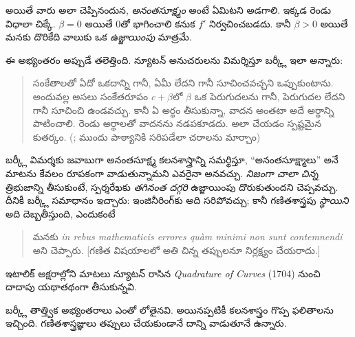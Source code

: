 \documentclass[../../../include/open-logic-section]{subfiles}
\begin{document}
అయితే వారు అలా చెప్పినందున, \emph{అనంతసూక్ష్మం} అంటే ఏమిటని అడగాలి. ఇక్కడ రెండు విధాలా చిక్కే. $\beta = 0$ అయితే $0$తో భాగించాలి కనుక $f'$ నిర్వచించబడదు. కానీ $\beta >
0$ అయితే మనకు దొరికేది వాలుకు ఒక \emph{ఉజ్జాయింపు} మాత్రమే.

ఈ అభ్యంతరం అప్పుడే తలెత్తింది. న్యూటన్ అనుచరులను విమర్శిస్తూ బర్క్లీ ఇలా అన్నారు:
\begin{quote}
సంకేతాలతో ఏదో ఒకదాన్ని గానీ, ఏమీ లేదని గానీ సూచించవచ్చని ఒప్పుకుంటాను. అందువల్ల అసలు సంకేతరూపం $c + \beta$లో $\beta$ ఒక పెరుగుదలను గానీ, పెరుగుదల లేదని గానీ సూచించి ఉండవచ్చు. కానీ ఏ అర్థం తీసుకున్నా, వాదన అంతటా అదే అర్థాన్ని పాటించాలి. రెండు అర్థాలతో వాదనను నడపకూడదు. అలా చేయడం స్పష్టమైన కుతర్కం. (\citealt[\S{}XIII]{Berkeley1734}; ముందు పాఠ్యానికి సరిపడేలా చరాలను మార్చాం)
\end{quote}
బర్క్లీ విమర్శకు జవాబుగా అనంతసూక్ష్మ కలనశాస్త్రాన్ని సమర్థిస్తూ, ``అనంతసూక్ష్మాలు'' అనే మాటను కేవలం రూపకంగా వాడుతున్నామని ఎవరైనా అనవచ్చు. \emph{నిజంగా చాలా చిన్న} త్రిభుజాన్ని తీసుకుంటే, స్పర్శరేఖకు \emph{తగినంత దగ్గరి} ఉజ్జాయింపు దొరుకుతుందని చెప్పవచ్చు. దీనికీ బర్క్లీ సమాధానం ఇచ్చారు: ఇంజినీరింగ్‌కు అది సరిపోవచ్చు; కానీ గణితశాస్త్రపు \emph{స్థాయిని} అది దెబ్బతీస్తుంది, ఎందుకంటే
\begin{quote}
మనకు \emph{in rebus mathematicis errores qu\`{a}m minimi
non sunt contemnendi} అని చెప్పారు. [గణిత విషయాలలో అతి చిన్న తప్పులనూ నిర్లక్ష్యం చేయరాదు.] \citep[\S{}IX]{Berkeley1734}
\end{quote}
ఇటాలిక్ అక్షరాల్లోని మాటలు న్యూటన్ రాసిన \emph{Quadrature of Curves} (1704) నుంచి దాదాపు యథాతథంగా తీసుకున్నవి.

బర్క్లీ తాత్త్విక అభ్యంతరాలు ఎంతో లోతైనవి. అయినప్పటికీ కలనశాస్త్రం గొప్ప ఫలితాలను ఇచ్చింది. గణితశాస్త్రజ్ఞులు తప్పులు చేయకుండానే దాన్ని వాడుతూనే ఉన్నారు.
\end{document}
